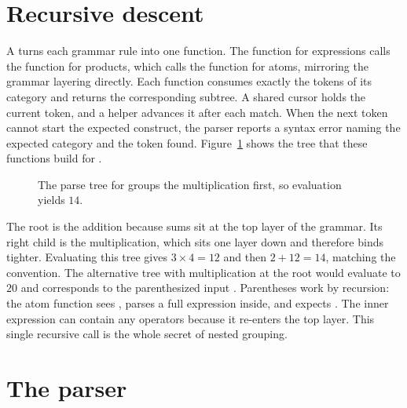 \section{Recursive descent}
\label{sec:ch04-recursive-descent}

A  turns each grammar rule into one function.
The function for expressions calls the function for products, which calls the function for atoms, mirroring the grammar layering directly.
Each function consumes exactly the tokens of its category and returns the corresponding subtree.
A shared cursor holds the current token, and a helper advances it after each match.
When the next token cannot start the expected construct, the parser reports a syntax error naming the expected category and the token found.
Figure~\ref{fig:ch04-parse-tree} shows the tree that these functions build for .
\begin{figure}
\centering
{}
\caption{The parse tree for  groups the multiplication first, so evaluation yields $14$.}
\label{fig:ch04-parse-tree}
\end{figure}
The root is the addition because sums sit at the top layer of the grammar.
Its right child is the multiplication, which sits one layer down and therefore binds tighter.
Evaluating this tree gives $3 \times 4 = 12$ and then $2 + 12 = 14$, matching the convention.
The alternative tree with multiplication at the root would evaluate to $20$ and corresponds to the parenthesized input .
Parentheses work by recursion: the atom function sees \code{(}, parses a full expression inside, and expects \code{)}.
The inner expression can contain any operators because it re-enters the top layer.
This single recursive call is the whole secret of nested grouping.

\section{The parser}
\label{sec:ch04-parser}


